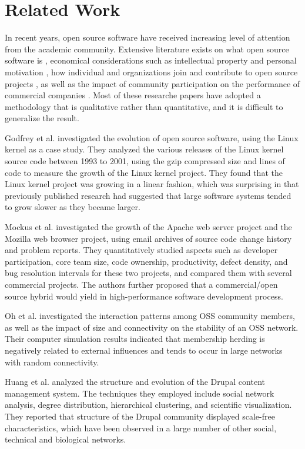 \documentclass[conference]{IEEEtran}
\begin{document}
\section{Related Work}
\label{sec:related}

In recent years, open source software have received increasing level of attention from the academic community. Extensive literature exists on what open source software is \cite{g1}, economical considerations such as intellectual property and personal motivation \cite{g2}, how individual and organizations join and contribute to open source projects \cite{g3}, as well as the impact of community participation on the performance of commercial companies \cite{g4}. Most of these researche papers have adopted a methodology that is qualitative rather than quantitative, and it is difficult to generalize the result. 

Godfrey et al. \cite{c9} investigated the evolution of open source software, using the Linux kernel as a case study. They analyzed the various releases of the Linux kernel source code between 1993 to 2001, using the gzip compressed size and lines of code to measure the growth of the Linux kernel project. They found that the Linux kernel project was growing in a linear fashion, which was surprising in that previously published research had suggested that large software systems tended to grow slower as they became larger. 

Mockus et al. \cite{c10} investigated the growth of the Apache web server project and the Mozilla web browser project, using email archives of source code change history and problem reports. They quantitatively studied aspects such as developer participation, core team size, code ownership, productivity, defect density, and bug resolution intervals for these two projects, and compared them with several commercial projects. The authors further proposed that a commercial/open source hybrid would yield in high-performance software development process. 

Oh et al. \cite{c11} investigated the interaction patterns among OSS community members, as well as the impact of size and connectivity on the stability of an OSS network. Their computer simulation results indicated that membership herding is negatively related to external influences and tends to occur in large networks with random connectivity. 

Huang et al. \cite{c12} analyzed the structure and evolution of the Drupal content management system. The techniques they employed include social network analysis, degree distribution, hierarchical clustering, and scientific visualization. They reported that structure of the Drupal community displayed scale-free characteristics, which have been observed in a large number of other social, technical and biological networks. 
\end{document}
